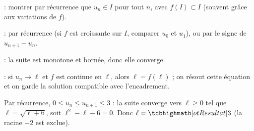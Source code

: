 
\noindent
\begin{minipage}[c]{0.585\linewidth}
\begin{methode}
\begin{etapes}
  \item {} : montrer par récurrence que $u_n\in I$ pour tout $n$, avec
    $f(I)\subset I$ (souvent grâce aux variations de $f$).
  \item {} : par récurrence (si $f$ est croissante sur $I$, comparer $u_0$
    et $u_1$), ou par le signe de $u_{n+1}-u_n$.
  \item {} : la suite est monotone et bornée, donc elle converge.
  \item {} : si $u_n\to\ell$ et $f$ est continue en $\ell$, alors $\ell=f(\ell)$ ; on
    résout cette équation et on garde la solution compatible avec l'encadrement.
\end{etapes}
\end{methode}
\begin{exemple}[$u_0=0$ et $u_{n+1}=\sqrt{u_n+6}$]
Par récurrence, $0\leq u_n\leq u_{n+1}\leq3$ : la suite converge vers $\ell\geq0$ tel que
$\ell=\sqrt{\ell+6}$, soit $\ell^{2}-\ell-6=0$. Donc $\ell=\res{3}$ (la racine $-2$ est exclue).
\end{exemple}
\end{minipage}\hfill
